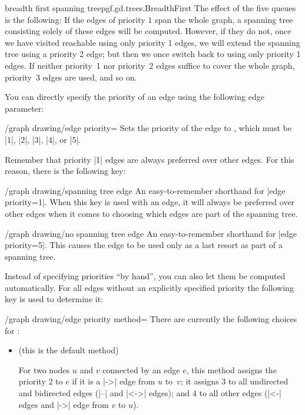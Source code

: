 \begin{gdalgorithm}{breadth first spanning tree}{pgf.gd.trees.BreadthFirst}
  The effect of the five queues is the following: If the edges of
  priority $1$ span the whole graph, a spanning tree consisting solely
  of these edges will be computed. However, if they do not, once we
  have visited reachable using only priority 1 edges, we will extend
  the spanning tree using a priority 2 edge; but then we once switch
  back to using only priority 1 edges. If neither priority~1 nor
  priority~2 edges suffice to cover the whole graph, priority~3 edges
  are used, and so on.
  
  You can directly specify the priority of an edge using the following
  edge parameter:
  \begin{key}{/graph drawing/edge priority=}
    Sets the priority of the edge to , which must be
    |1|, |2|, |3|, |4|, or  |5|.      
  \end{key}
  Remember that priority |1| edges are always preferred over other
  edges. For this reason, there is the following key:
  \begin{key}{/graph drawing/spanning tree edge}
    An easy-to-remember shorthand for |edge priority=1|. When this key
    is used with an edge, it will always be preferred over other edges
    when it comes to choosing which edges are part of the spanning tree.    
  \end{key}
  \begin{key}{/graph drawing/no spanning tree edge}
    An easy-to-remember shorthand for |edge priority=5|. This causes
    the edge to be used only as a last resort as part of a spanning
    tree. 
  \end{key}
  
  Instead of specifying priorities ``by hand'', you can also let them
  be computed automatically. For all edges without an explicitly
  specified priority the following key is used to determine it:
  \begin{key}{/graph drawing/edge priority method=}
    There are currently the following choices for :
    \begin{itemize}
    \item {} (this is the default method)
      
      For two nodes $u$ and $v$ connected by an edge $e$, this method
      assigns the priority 2 to $e$ if it is a |->| edge from $u$
      to~$v$; it assigns $3$ to all undirected and bidirected edges
      (|--| and |<->| edges); and $4$ to all other edges (|<-| edges
      and |->| edge from $v$ to $u$).


\end{itemize}
\end{key}
\end{gdalgorithm}
